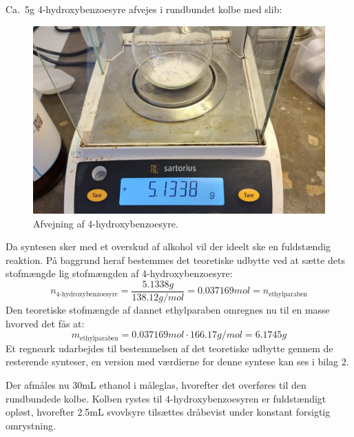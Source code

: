     Ca.\ 5g 4-hydroxybenzoesyre afvejes i rundbundet kolbe med slib:
    \begin{figure}[H] \centering
        \includegraphics[width=\textwidth]{billeder/afvejning}
        \caption{Afvejning af 4-hydroxybenzoesyre.}
    \end{figure} 
    Da syntesen sker med et overskud af alkohol vil der ideelt ske en fuldstændig reaktion. På baggrund heraf bestemmes det teoretiske udbytte ved at sætte dets stofmængde lig stofmængden af 4-hydroxybenzoesyre:
    \[
        n_{\text{4-hydroxybenzoesyre}}=\frac{5.1338\si{g}}{138.12\si{g \per mol}}=0.037169\si{mol}=n_{\text{ethylparaben}}
    \]
    Den teoretiske stofmængde af dannet ethylparaben omregnes nu til en masse hvorved det fås at:
    \[
        m_{\text{ethylparaben}}=0.037169\si{mol} \cdot 166.17\si{g\per mol}=6.1745g
    \]
    Et regneark udarbejdes til bestemmelsen af det teoretiske udbytte gennem de resterende synteser, en version med værdierne for denne syntese kan ses i bilag 2.

    Der afmåles nu 30mL ethanol i måleglas, hvorefter det overføres til den rundbundede kolbe. Kolben rystes til 4-hydroxybenzoesyren er fuldstændigt opløst, hvorefter 2.5mL svovlsyre tilsættes dråbevist under konstant forsigtig omrystning. 

